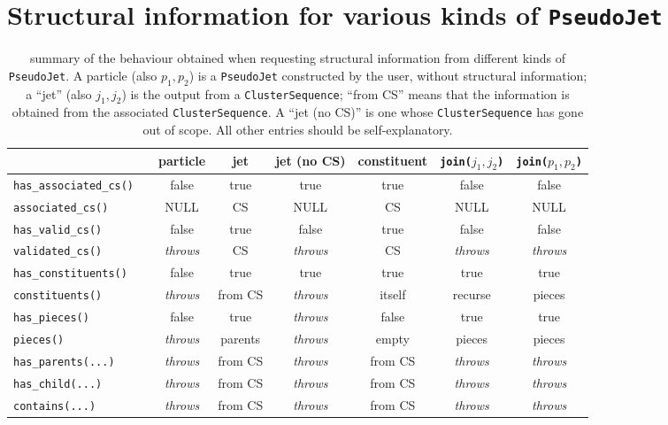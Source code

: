 \documentclass[12pt,a4]{article}
\newcommand{\ttt}[1]{{\small\texttt{#1}}}
\newcommand{\throws}{{\it throws}}
\begin{document}
\section{Structural information for various kinds of \texttt{PseudoJet}}
\label{app:structure_table}

\begin{table}[t]\centering
\begin{tabular}{lccccccc}
\toprule
  && particle & jet & jet (no CS) & constituent & \ttt{join(}$j_1,j_2$\ttt{)} & \ttt{join(}$p_1,p_2$\ttt{)} \\
\midrule
\ttt{has\_associated\_cs()}
                     && false   & true    &  true   & true    & false    & false   \\
\ttt{associated\_cs()}     
                     && NULL    &  CS     &  NULL   &  CS     & NULL     & NULL    \\
\midrule                       
\ttt{has\_valid\_cs()}
                     && false   & true    &  false  & true    & false    & false   \\
\ttt{validated\_cs()}&& \throws &  CS     & \throws &  CS     & \throws  & \throws \\
\midrule                       
\ttt{has\_constituents()}
                     && false   & true    & true    & true    & true     & true    \\
\ttt{constituents()} && \throws & from CS & \throws & itself  & recurse  & pieces  \\
\midrule                       
\ttt{has\_pieces()}  && false   & true    & \throws & false   & true     & true    \\ 
\ttt{pieces()}       && \throws & parents & \throws & empty   & pieces   & pieces  \\ 
\midrule                       
\ttt{has\_parents(...)}
                     && \throws & from CS & \throws & from CS & \throws  & \throws \\ 
\ttt{has\_child(...)}&& \throws & from CS & \throws & from CS & \throws  & \throws \\ 
\ttt{contains(...)}  && \throws & from CS & \throws & from CS & \throws  & \throws \\ 
\bottomrule
\end{tabular}
\caption{summary of the behaviour obtained when requesting
  structural information from different kinds of \ttt{PseudoJet}. A
  particle (also $p_1,p_2$) is a \ttt{PseudoJet}
  constructed by the user, without structural information; a ``jet''
  (also $j_1,j_2$) is the output from a
  \ttt{ClusterSequence}; ``from CS'' means that the information is
  obtained from the associated \ttt{ClusterSequence}. 
  A ``jet (no CS)'' is one whose \ttt{ClusterSequence} has gone out of
  scope.
  All other entries should be self-explanatory.}\label{tab:structure}
\end{table}
\end{document}
